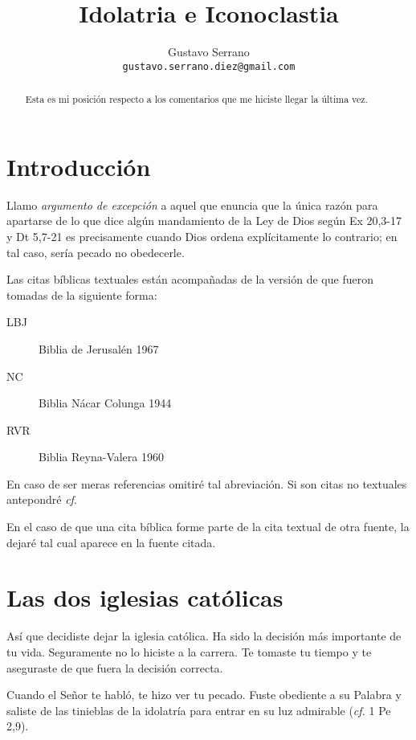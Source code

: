 \documentclass{article}
\title{Idolatria e Iconoclastia}
\author{Gustavo Serrano \\ \tt{gustavo.serrano.diez@gmail.com}}
\begin{document}
\maketitle

\begin{abstract}
\noindent
Esta es mi posici\'on respecto a los comentarios que me hiciste llegar la \'ultima vez.
\end{abstract}

\tableofcontents

\section{Introducci\'on}

Llamo \emph{argumento de excepci\'on} a aquel que enuncia que la \'unica raz\'on para apartarse de lo que dice alg\'un mandamiento de la Ley de Dios seg\'un Ex 20,3-17 y Dt 5,7-21 es precisamente cuando Dios ordena expl\'{i}citamente lo contrario; en tal caso, ser\'{i}a pecado no obedecerle.

Las citas b\'{i}blicas textuales est\'an acompa\~nadas de la versi\'on de que fueron tomadas de la siguiente forma:

\begin{description}
\item[LBJ] Biblia de Jerusal\'en 1967
\item[NC] Biblia N\'acar Colunga 1944
\item[RVR] Biblia Reyna-Valera 1960
\end{description}

\noindent
En caso de ser meras referencias omitir\'e tal abreviaci\'on. Si son citas no textuales antepondr\'e \emph{cf}.

En el caso de que una cita b\'{i}blica forme parte de la cita textual de otra fuente, la dejar\'e tal cual aparece en la fuente citada.

\section{Las dos iglesias cat\'olicas}

As\'{i} que decidiste dejar la iglesia cat\'olica. Ha sido la decisi\'on m\'as importante de tu vida. Seguramente no lo hiciste a la carrera. Te tomaste tu tiempo y te aseguraste de que fuera la decisi\'on correcta. 

Cuando el Se\~nor te habl\'o, te hizo ver tu pecado. Fuste obediente a su Palabra y saliste de las tinieblas de la idolatr\'{i}a para entrar en su luz admirable (\emph{cf.} 1 Pe 2,9).
\end{document}
